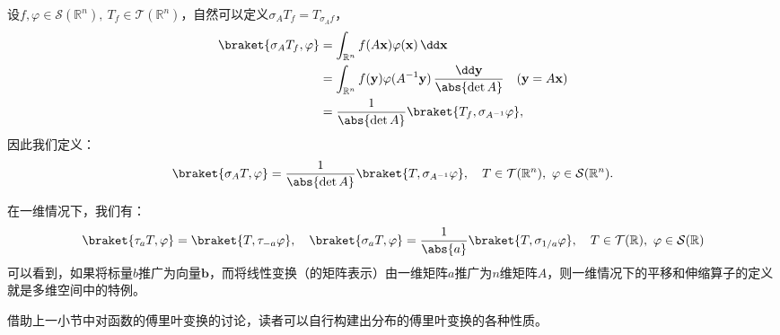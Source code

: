 \begin{example}[伸缩算子]
    设$f,\varphi\in\mathcal{S}(\mathbb{R}^n),\ T_f\in\mathcal{T}(\mathbb{R}^n)$，自然可以定义$\sigma_A T_f=T_{\sigma_A f}$，
    \begin{align}
        \braket{\sigma_A T_f,\varphi}&=\int_{\mathbb{R}^n}f(A\mathbf{x})\varphi(\mathbf{x})\,\dd\mathbf{x}\nonumber\\
        &=\int_{\mathbb{R}^n}f(\mathbf{y})\varphi(A^{-1}\mathbf{y})\,\frac{\dd\mathbf{y}}{\abs{\det A}}\quad(\mathbf{y}=A\mathbf{x})\nonumber\\
        &=\frac{1}{\abs{\det A}}\braket{T_f,\sigma_{A^{-1}}\varphi},
    \end{align}
    因此我们定义：
    \begin{equation}
        \braket{\sigma_A T,\varphi}=\frac{1}{\abs{\det A}}\braket{T,\sigma_{A^{-1}}\varphi},\quad T\in\mathcal{T}(\mathbb{R}^n),\ \varphi\in\mathcal{S}(\mathbb{R}^n).
    \end{equation}
\end{example}
在一维情况下，我们有：
\begin{equation}
    \braket{\tau_a T,\varphi}=\braket{T,\tau_{-a}\varphi},\quad\braket{\sigma_{a}T,\varphi}=\frac{1}{\abs{a}}\braket{T,\sigma_{1/a}\varphi},\quad T\in\mathcal{T}(\mathbb{R}),\ \varphi\in\mathcal{S}(\mathbb{R})
\end{equation}
可以看到，如果将标量$b$推广为向量$\mathbf{b}$，而将线性变换（的矩阵表示）由一维矩阵$a$推广为$n$维矩阵$A$，则一维情况下的平移和伸缩算子的定义就是多维空间中的特例。

借助上一小节中对函数的傅里叶变换的讨论，读者可以自行构建出分布的傅里叶变换的各种性质。

